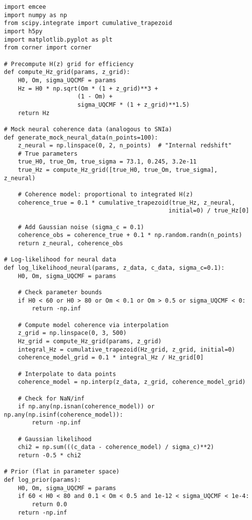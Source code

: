 \documentclass[11pt,a4paper,preprint]{article}
\begin{document}
\begin{verbatim}
import emcee
import numpy as np
from scipy.integrate import cumulative_trapezoid
import h5py
import matplotlib.pyplot as plt
from corner import corner

# Precompute H(z) grid for efficiency
def compute_Hz_grid(params, z_grid):
    H0, Om, sigma_UQCMF = params
    Hz = H0 * np.sqrt(Om * (1 + z_grid)**3 + 
                     (1 - Om) + 
                     sigma_UQCMF * (1 + z_grid)**1.5)
    return Hz

# Mock neural coherence data (analogous to SNIa)
def generate_mock_neural_data(n_points=100):
    z_neural = np.linspace(0, 2, n_points)  # "Internal redshift"
    # True parameters
    true_H0, true_Om, true_sigma = 73.1, 0.245, 3.2e-11
    true_Hz = compute_Hz_grid([true_H0, true_Om, true_sigma], z_neural)
    
    # Coherence model: proportional to integrated H(z)
    coherence_true = 0.1 * cumulative_trapezoid(true_Hz, z_neural, 
                                               initial=0) / true_Hz[0]
    
    # Add Gaussian noise (sigma_c = 0.1)
    coherence_obs = coherence_true + 0.1 * np.random.randn(n_points)
    return z_neural, coherence_obs

# Log-likelihood for neural data
def log_likelihood_neural(params, z_data, c_data, sigma_c=0.1):
    H0, Om, sigma_UQCMF = params
    
    # Check parameter bounds
    if H0 < 60 or H0 > 80 or Om < 0.1 or Om > 0.5 or sigma_UQCMF < 0:
        return -np.inf
    
    # Compute model coherence via interpolation
    z_grid = np.linspace(0, 3, 500)
    Hz_grid = compute_Hz_grid(params, z_grid)
    integral_Hz = cumulative_trapezoid(Hz_grid, z_grid, initial=0)
    coherence_model_grid = 0.1 * integral_Hz / Hz_grid[0]
    
    # Interpolate to data points
    coherence_model = np.interp(z_data, z_grid, coherence_model_grid)
    
    # Check for NaN/inf
    if np.any(np.isnan(coherence_model)) or np.any(np.isinf(coherence_model)):
        return -np.inf
    
    # Gaussian likelihood
    chi2 = np.sum(((c_data - coherence_model) / sigma_c)**2)
    return -0.5 * chi2

# Prior (flat in parameter space)
def log_prior(params):
    H0, Om, sigma_UQCMF = params
    if 60 < H0 < 80 and 0.1 < Om < 0.5 and 1e-12 < sigma_UQCMF < 1e-4:
        return 0.0
    return -np.inf


\end{verbatim}
\end{document}
